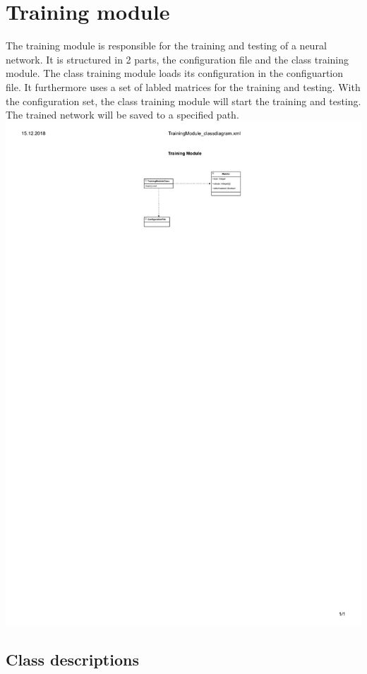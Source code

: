 \documentclass[parskip=full]{scrartcl}
\begin{document}
\section{Training module}
The training module is responsible for the training and testing of a neural network. It is structured in 2 parts, the configuration file and the class training module. The class training module loads its configuration in the configuartion file. It furthermore uses a set of labled matrices for the training and testing. With the configuration set, the class training module will start the training and testing. The trained network will be saved to a specified path.
%
\includegraphics{ClassDiagrams/PDF/TrainingModule_classdiagram.pdf}
\subsection{Class descriptions}
\end{document}
